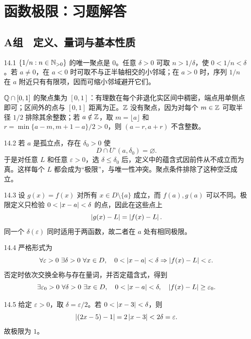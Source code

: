 \chapter{函数极限：习题解答}

\section*{A组　定义、量词与基本性质}

\begin{solution}{14.1}
\(\{1/n:n\in\mathbb{N}_{>0}\}\) 的唯一聚点是 \(0\)。任意 \(\delta>0\) 可取 \(n>1/\delta\)，使 \(0<1/n<\delta\)。若 \(a\ne0\)，在 \(a<0\) 时可取不与正半轴相交的小邻域；在 \(a>0\) 时，序列 \(1/n\) 在 \(a\) 附近只有有限项，因而可缩小邻域避开它们。

\(\mathbb{Q}\cap[0,1]\) 的聚点集为 \([0,1]\)：有理数在每个非退化实区间中稠密，端点用单侧点即可；区间外的点与 \([0,1]\) 距离为正。\(\mathbb{Z}\) 没有聚点，因为对每个 \(m\in\mathbb{Z}\) 可取半径 \(1/2\) 排除其余整数；若 \(a\notin\mathbb{Z}\)，取 \(m=\lfloor a\rfloor\) 和 \(r=\min\{a-m,m+1-a\}/2>0\)，则 \((a-r,a+r)\) 不含整数。
\end{solution}

\begin{solution}{14.2}
若 \(a\) 是孤立点，存在 \(\delta_0>0\) 使
\[
 D\cap U^\circ(a,\delta_0)=\varnothing.
\]
于是对任意 \(L\) 和任意 \(\varepsilon>0\)，选 \(\delta\le\delta_0\) 后，定义中的蕴含式因前件从不成立而为真。这样每个 \(L\) 都会成为“极限”，与唯一性冲突。聚点条件排除了这种空泛成立。
\end{solution}

\begin{solution}{14.3}
设 \(g(x)=f(x)\) 对所有 \(x\in D\setminus\{a\}\) 成立，而 \(f(a),g(a)\) 可以不同。极限定义只检验 \(0<\left|x-a\right|<\delta\) 的点，因此在这些点上
\[
 \left|g(x)-L\right|=\left|f(x)-L\right|.
\]
同一个 \(\delta(\varepsilon)\) 同时适用于两函数，故二者在 \(a\) 处有相同极限。
\end{solution}

\begin{solution}{14.4}
严格形式为
\[
 \forall\varepsilon>0\ \exists\delta>0\ \forall x\in D,\quad
 0<\abs{x-a}<\delta\Rightarrow\abs{f(x)-L}<\varepsilon.
\]
否定时依次交换全称与存在量词，并否定蕴含式，得到
\[
 \exists\varepsilon_0>0\ \forall\delta>0\ \exists x\in D,\quad
 0<\abs{x-a}<\delta,\quad\abs{f(x)-L}\ge\varepsilon_0.
\]
\end{solution}

\begin{solution}{14.5}
给定 \(\varepsilon>0\)，取 \(\delta=\varepsilon/2\)。若 \(0<\left|x-3\right|<\delta\)，则
\[
 \left|(2x-5)-1\right|=2\left|x-3\right|<2\delta=\varepsilon.
\]
故极限为 \(1\)。
\end{solution}

